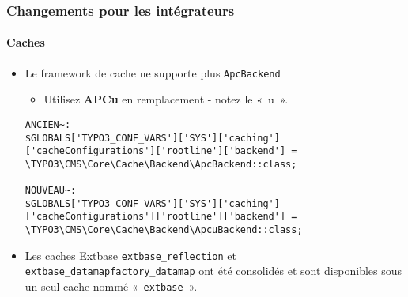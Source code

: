 \begin{frame}[fragile]
	\frametitle{Changements pour les intégrateurs}
	\framesubtitle{Caches}

	\lstset{basicstyle=\tiny\ttfamily}

	\begin{itemize}
		\item Le framework de cache ne supporte plus \texttt{ApcBackend}

			\begin{itemize}\smaller
				\item[\ding{228}] Utilisez \textbf{APCu} en remplacement - notez le «~u~».
			\end{itemize}

\begin{lstlisting}
ANCIEN~:
$GLOBALS['TYPO3_CONF_VARS']['SYS']['caching']['cacheConfigurations']['rootline']['backend'] =
\TYPO3\CMS\Core\Cache\Backend\ApcBackend::class;

NOUVEAU~:
$GLOBALS['TYPO3_CONF_VARS']['SYS']['caching']['cacheConfigurations']['rootline']['backend'] = \TYPO3\CMS\Core\Cache\Backend\ApcuBackend::class;
	\end{lstlisting}

		\item Les caches Extbase \texttt{extbase\_reflection} et \texttt{extbase\_datamapfactory\_datamap}
			ont été consolidés et sont disponibles sous un seul cache nommé «~\texttt{extbase}~».

	\end{itemize}

\end{frame}


